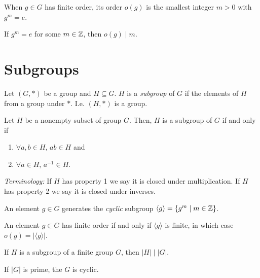 \begin{notation}
	When $g \in G$ has finite order, its order $o(g)$ is the smallest integer $m >
	0$ with $g^m = e$.
\end{notation}

\begin{notation}
	If $g^m = e$ for some $m \in {\mathbb{Z}}$, then $o(g) \mid m$.
\end{notation}

\section*{Subgroups}

\begin{definition}
	Let $(G, *)$ be a group and $H \subseteq G$. $H$ is a \emph{subgroup} of $G$
	if the elements of $H$ from a group under $*$. I.e. $(H, *)$ is a group.
\end{definition}

\begin{theorem}
	Let $H$ be a nonempty subset of group $G$. Then, $H$ is a subgroup of $G$ if
	and only if
	\begin{enumerate}
		\item $\forall a,b \in H$, $ab \in H$ and
		\item $\forall a \in H$, $a^{-1} \in H$.
	\end{enumerate}
	\emph{Terminology:} If $H$ has property 1 we say it is closed under
	multiplication. If $H$ has property 2 we say it is closed under inverses.
\end{theorem}

\begin{definition}
	An element $g \in G$ generates the \emph{cyclic} subgroup $\langle g
	\rangle = \{g^m \mid m \in {\mathbb{Z}}\}$.
\end{definition}

\begin{theorem}
	An element $g \in G$ has finite order if and only if $\langle g \rangle$ is
	finite, in which case $o(g) = |\langle g \rangle|$.
\end{theorem}

\begin{theorem}
	If $H$ is a subgroup of a finite group $G$, then $|H| \mid |G|$.
\end{theorem}

\begin{corollary}
	If $|G|$ is prime, the $G$ is cyclic.
\end{corollary}

